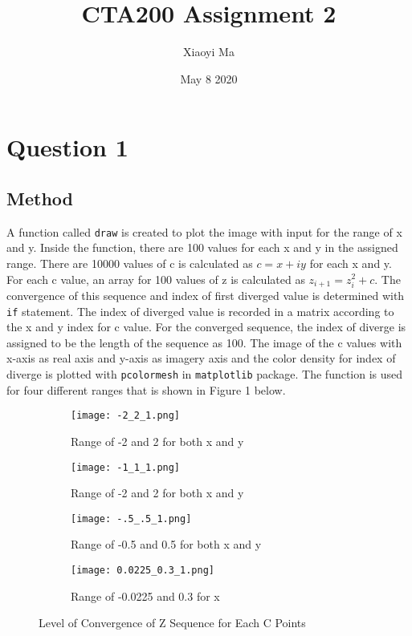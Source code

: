 \documentclass[12pt]{article}
\title{CTA200 Assignment 2}
\author{Xiaoyi Ma}
\date{May 8 2020}
\begin{document}
\maketitle


\section{Question 1}

\subsection{Method}
A function called \texttt{draw} is created to plot the image with input for the range of x and y. Inside the function, there are 100 values for each x and y in the assigned range. There are 10000 values of c is calculated as $c=x+iy$ for each x and y. For each c value, an array for 100 values of z is calculated as $z_{i+1}=z_i^2+c$\cite{Lab}. The convergence of this sequence and index of first diverged value is determined with \texttt{if} statement. The index of diverged value is recorded in a matrix according to the x and y index for c value. For the converged sequence, the index of diverge is assigned to be the length of the sequence as 100. The image of the c values with x-axis as real axis and y-axis as imagery axis and the color density for index of diverge is plotted with \texttt{pcolormesh} in \texttt{matplotlib} package. The function is used for four different ranges that is shown in Figure 1 below.

\begin{figure}[h]
\centering
\begin{subfigure}{.49\textwidth}
  \centering
  \texttt{[image: -2\_2\_1.png]}
  \caption{Range of -2 and 2 for both x and y}
\end{subfigure}%
\begin{subfigure}{.49\textwidth}
  \centering
  \texttt{[image: -1\_1\_1.png]}
  \caption{Range of -2 and 2 for both x and y }
 \end{subfigure}
 \begin{subfigure}{.49\textwidth}
  \centering
  \texttt{[image: -.5\_.5\_1.png]}
  \caption{Range of -0.5 and 0.5 for both x and y }
 \end{subfigure}
 \begin{subfigure}{.49\textwidth}
  \centering
  \texttt{[image: 0.0225\_0.3\_1.png]}
  \caption{Range of -0.0225 and 0.3 for x}
 \end{subfigure}
\caption{Level of Convergence of Z Sequence for Each C Points}
\label{fig 1}
\end{figure}
\end{document}

